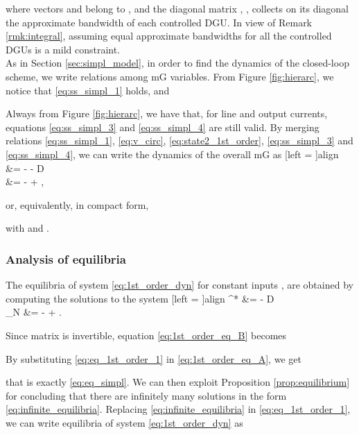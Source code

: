 \documentclass[a4paper]{article}
\theoremstyle{plain}
\begin{document}
where vectors
 and  belong to , and the diagonal matrix , , collects on its diagonal the approximate bandwidth of each controlled DGU.
In view of Remark \ref{rmk:integral}, assuming equal approximate bandwidths for all the controlled DGUs is a mild constraint.\\
As in Section \ref{sec:simpl_model}, in order to find the dynamics of the closed-loop scheme, we write relations among mG variables. From Figure \ref{fig:hierarc}, we notice that \eqref{eq:ss_simpl_1} holds, and

Always from Figure \ref{fig:hierarc}, we have that, for line and output currents, equations \eqref{eq:ss_simpl_3} and \eqref{eq:ss_simpl_4} are still valid. By merging relations \eqref{eq:ss_simpl_1}, \eqref{eq:v_circ}, \eqref{eq:state2_1st_order}, \eqref{eq:ss_simpl_3} and \eqref{eq:ss_simpl_4}, we can write the dynamics of the overall mG as
[left = \empheqlbrace]{align}
	\label{eq:1st_order_dyn_A}  &= -  -  D\\
	\label{eq:1st_order_dyn_B} &= \Omega{}-\Omega {} + \Omega {},
	
or, equivalently, in compact form,

with  and .

\subsubsection{Analysis of equilibria}
The equilibria of
system \eqref{eq:1st_order_dyn} for constant
inputs , are obtained by
computing the solutions
 to the system 
[left =  \empheqlbrace]{align}
	\label{eq:1st_order_eq_A}
	 ^* &= - D \\
	\label{eq:1st_order_eq_B}
	_N &= \Omega{}-\Omega {} + \Omega {}.
	
Since matrix  is invertible, equation \eqref{eq:1st_order_eq_B} becomes

By substituting \eqref{eq:eq_1st_order_1} in \eqref{eq:1st_order_eq_A}, we get

that is exactly \eqref{eq:eq_simpl}. We can then exploit Proposition \ref{prop:equilibrium} for concluding that there are infinitely many solutions  in the form \eqref{eq:infinite_equilibria}.
Replacing \eqref{eq:infinite_equilibria} in \eqref{eq:eq_1st_order_1}, we can write equilibria of system \eqref{eq:1st_order_dyn} as
\end{document}
